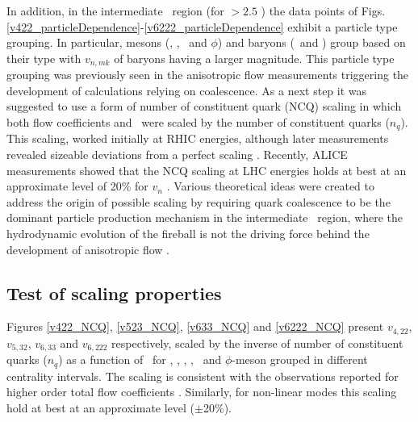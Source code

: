 \newpage

In addition, in the intermediate \pT~region (for \pT $> 2.5$ \GeV) the data points of Figs. \ref{v422_particleDependence}-\ref{v6222_particleDependence} exhibit a particle type grouping. In particular, mesons (\pion, \kaon, \Ks~and $\phi$) and baryons (\proton~and \lambdas) group based on their type with $v_{n,mk}$ of baryons having a larger magnitude. This particle type grouping was previously seen in the anisotropic flow measurements \cite{Abelev:2014pua,Adam:2016nfo,Acharya:2018zuq,Adams:2003am,Abelev:2007qg,Adler:2003kt,Adare:2006ti} triggering the development of calculations relying on coalescence. As a next step it was suggested to use a form of number of constituent quark (NCQ) scaling in which both flow coefficients and \pT~were scaled by the number of constituent quarks ($n_{q}$). This scaling, worked initially at RHIC energies, although later measurements revealed sizeable deviations from a perfect scaling \cite{Adams:2003am,Abelev:2007qg,Adler:2003kt,Adare:2006ti}. Recently, ALICE measurements showed that the NCQ scaling at LHC energies holds at best at an approximate level of 20\% for $v_{n}$ \cite{Abelev:2014pua,Adam:2016nfo,Acharya:2018zuq}. Various theoretical ideas were created to address the origin of possible scaling by requiring quark coalescence to be the dominant particle production mechanism in the intermediate \pT~region, where the hydrodynamic evolution of the fireball is not the driving force behind the development of anisotropic flow \cite{Voloshin:2002wa,Molnar:2003ff}.

\subsection{Test of scaling properties}
\label{subsection:NCQscaling}

Figures \ref{v422_NCQ}, \ref{v523_NCQ}, \ref{v633_NCQ} and \ref{v6222_NCQ} present $v_{4,22}$, $v_{5,32}$, $v_{6,33}$ and $v_{6,222}$ respectively, scaled by the inverse of number of constituent quarks ($n_{q}$) as a function of \pTnq~for \pion, \kaon, \proton, \Ks, \lambdas~and $\phi$-meson grouped in different centrality intervals. The scaling is consistent with the observations reported for higher order total flow coefficients \cite{Acharya:2018zuq}. Similarly, for non-linear modes this scaling hold at best at an approximate level ($\pm$20\%). 

